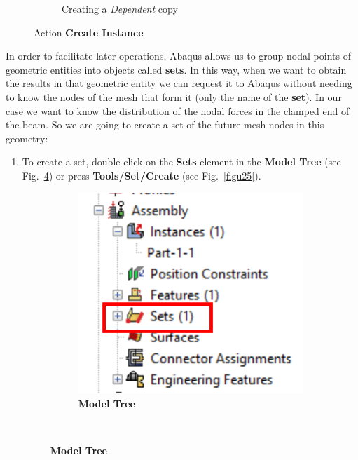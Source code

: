 \begin{figure}[H]
\begin{subfigure}{0.42\textwidth}
    \caption{Creating a \textit{Dependent} copy}
    \label{figu23}
  \end{subfigure}%
  \caption{Action \textbf{Create Instance}}
\end{figure}

In order to facilitate later operations, Abaqus allows us to group nodal points
of geometric entities into objects called \textbf{sets}. In this way,
when we want to obtain the results in that geometric entity we can
request it to Abaqus without needing to know the nodes of the mesh
that form it (only the name of the \textbf{set}). In our case we want
to know the distribution of the nodal forces in the clamped end of the
beam. So we are going to create a set of the future mesh nodes in this
geometry:
\begin{enumerate}
\item To create a set, double-click on the \textbf{Sets} element in the \textbf{Model Tree} (see Fig.~\ref{figu24}) or press \textbf{Tools/Set/Create} (see Fig.~\ref{figu25}).
  \begin{figure}[H]
    \centering
    \begin{subfigure}{0.35\textwidth}
      \includegraphics[width=\textwidth]{./body/images/imagen24.pdf}
      \caption{\textbf{Model Tree}}
      \label{figu24}
    \end{subfigure}%
    ~ %

\end{figure}
\end{enumerate}
